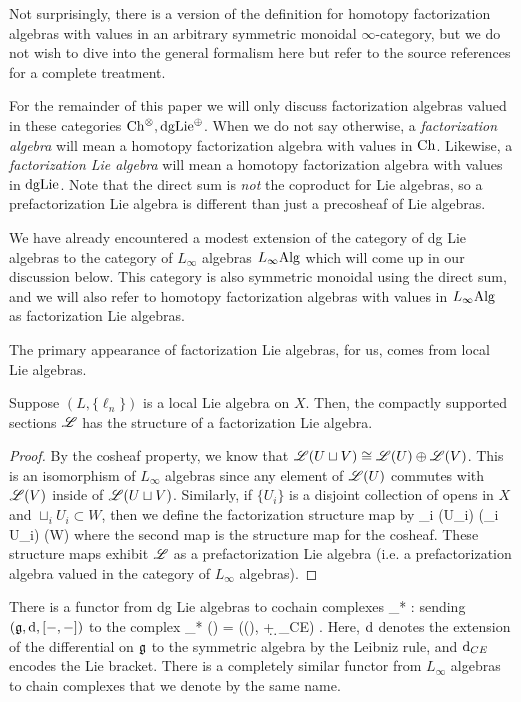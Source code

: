 Not surprisingly, there is a version of the definition for homotopy factorization algebras with values in an arbitrary symmetric monoidal $\infty$-category, but we do not wish to dive into the general formalism here but refer to the source references \cite{AF1, LurieHA,..} for a complete treatment.

For the remainder of this paper we will only discuss factorization algebras valued in these categories ${\rm Ch}^\otimes, {\rm dgLie}^{\oplus}$.
When we do not say otherwise, a {\em factorization algebra} will mean a homotopy factorization algebra with values in ${\rm Ch}$. 
Likewise, a {\em factorization Lie algebra} will mean a homotopy factorization algebra with values in ${\rm dgLie}$. 
Note that the direct sum is {\em not} the coproduct for Lie algebras, so a prefactorization Lie algebra is different than just a precosheaf of Lie algebras. 

We have already encountered a modest extension of the category of dg Lie algebras to the category of $L_\infty$ algebras $L_\infty{\rm Alg}$ which will come up in our discussion below.
This category is also symmetric monoidal using the direct sum, and we will also refer to homotopy factorization algebras with values in $L_\infty{\rm Alg}$ as factorization Lie algebras.

The primary appearance of factorization Lie algebras, for us, comes from local Lie algebras.
 
\begin{lem}
Suppose $(L, \{\ell_n\})$ is a local Lie algebra on $X$.
Then, the compactly supported sections $\mathscr L$ has the structure of a factorization Lie algebra.
\end{lem}
\begin{proof}
By the cosheaf property, we know that $\mathscr L(U \sqcup V) \cong \mathscr L(U) \oplus \mathscr L(V)$. 
This is an isomorphism of $L_\infty$ algebras since any element of $\mathscr L(U)$ commutes with $\mathscr L(V)$ inside of $\mathscr L(U \sqcup V)$. 
Similarly, if $\{U_i\}$ is a disjoint collection of opens in $X$ and $\sqcup_i U_i \subset W$, then we define the factorization structure map by
\ben
\oplus_i \sL(U_i) \cong \sL(\sqcup_i U_i) \to \sL (W)
\een
where the second map is the structure map for the cosheaf. 
These structure maps exhibit $\mathscr L$ as a prefactorization Lie algebra (i.e. a prefactorization algebra valued in the category of $L_\infty$ algebras). 
\end{proof}

There is a functor from dg Lie algebras to cochain complexes 
\ben
\clieu_* : \dgLie \to \Ch
\een
sending $(\mathfrak g, {\rm d} , [-,-])$ to the complex
\ben
\clieu_* (\fg) = \left(\Sym(\fg[1]), \d + \d_{CE}\right) .
\een
Here, ${\rm d}$ denotes the extension of the differential on $\mathfrak g$ to the symmetric algebra by the Leibniz rule, and ${\rm d}_{CE}$ encodes the Lie bracket.
There is a completely similar functor from $L_\infty$ algebras to chain complexes that we denote by the same name.

